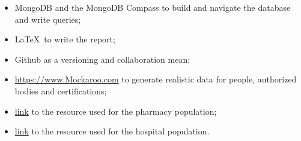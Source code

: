 \documentclass[12pt, a4paper]{article}
\begin{document}
\begin{itemize}
    \item MongoDB and the MongoDB Compass to build and navigate the database 
        and write queries;
    \item \LaTeX~to write the report;
    \item Github as a versioning and collaboration mean;
    \item \url{https://www.Mockaroo.com} 
        to generate realistic data for people, authorized bodies and 
        certifications;
    \item \href{https://data.gov.sg/dataset/listing-of-licensed-pharmacies}{link}
        to the resource used for the pharmacy population;
    \item \href{https://corgis-edu.github.io/corgis/csv/hospitals/}{link}
        to the resource used for the hospital population.
\end{itemize}

\clearpage
\end{document}
